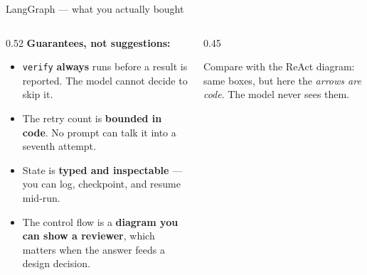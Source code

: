\documentclass[aspectratio=169,10pt]{beamer}
\newcommand{\code}[1]{\texttt{\small #1}}
\newcommand{\hl}[1]{\textcolor{accent}{\textbf{#1}}}
\begin{document}
\begin{frame}{LangGraph --- what you actually bought}
\begin{columns}[T,onlytextwidth]
\begin{column}{0.52\textwidth}
\textbf{Guarantees, not suggestions:}
\begin{itemize}\itemsep5pt\small
  \item \code{verify} \hl{always} runs before a result is reported.
        The model cannot decide to skip it.
  \item The retry count is \hl{bounded in code}. No prompt can talk it into a
        seventh attempt.
  \item State is \hl{typed and inspectable} --- you can log, checkpoint, and
        resume mid-run.
  \item The control flow is a \hl{diagram you can show a reviewer}, which
        matters when the answer feeds a design decision.
\end{itemize}
\end{column}
\begin{column}{0.45\textwidth}
\begin{center}
\end{center}
\vspace{0.5em}
{\scriptsize\color{gray} Compare with the ReAct diagram: same boxes, but here
the \emph{arrows are code}. The model never sees them.}
\end{column}
\end{columns}
\end{frame}
\end{document}
